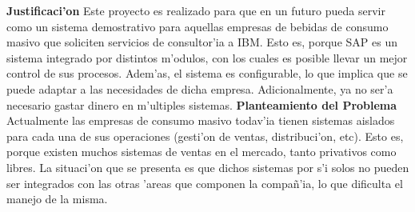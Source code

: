 \newline
\newline
\label{sect:justificacion}
\textbf{Justificaci'on}
\newline
\newline
\indent Este proyecto es realizado para que en un futuro pueda servir como un sistema demostrativo para aquellas empresas de bebidas de consumo masivo que soliciten servicios de consultor'ia a IBM. Esto es, porque SAP es un sistema integrado por distintos m'odulos, con los cuales es posible llevar un mejor control de sus procesos. Adem'as, el sistema es configurable, lo que implica que se puede adaptar a las necesidades de dicha empresa. Adicionalmente, ya no ser'a necesario gastar dinero en m'ultiples sistemas.
\label{sect:planteamiento}
\newline
\newline
\newline
\textbf{Planteamiento del Problema}
\newline
\newline
\indent Actualmente las empresas de consumo masivo todav'ia tienen sistemas aislados para cada una de sus operaciones (gesti'on de ventas, distribuci'on, etc). Esto es, porque  existen muchos sistemas de ventas en el mercado, tanto privativos como libres. La situaci'on que se presenta es que dichos sistemas por s'i solos no pueden ser integrados con las otras 'areas que componen la compa\~n'ia, lo que dificulta el manejo de la misma. 
		

